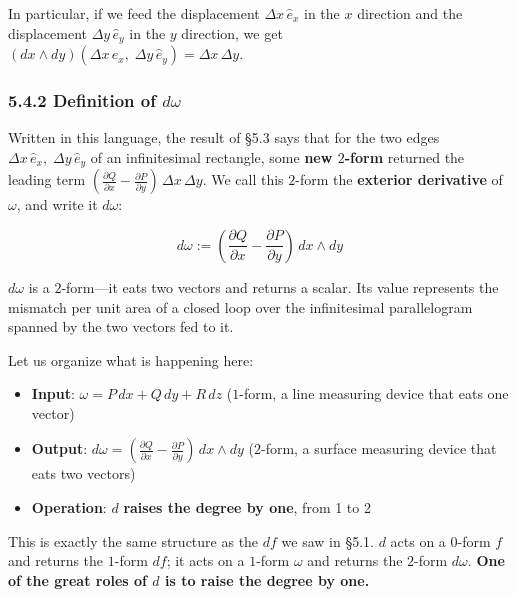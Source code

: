 \documentclass[a4paper,12pt,openany]{book}
\begin{document}
In particular, if we feed the displacement \(\Delta x\,\hat{e}_x\) in
the \(x\) direction and the displacement \(\Delta y\,\hat{e}_y\) in the
\(y\) direction, we get
\((dx \wedge dy)(\Delta x\,\hat{e}_x,\; \Delta y\,\hat{e}_y) = \Delta x\,\Delta y\).

\hypertarget{definition-of-domega}{%
\subsubsection{\texorpdfstring{5.4.2 Definition of
\(d\omega\)}{5.4.2 Definition of d\textbackslash omega}}\label{definition-of-domega}}

Written in this language, the result of §5.3 says that for the two edges
\(\Delta x\,\hat{e}_x,\; \Delta y\,\hat{e}_y\) of an infinitesimal
rectangle, some \textbf{new $2$-form} returned the leading term
\((\frac{\partial Q}{\partial x} - \frac{\partial P}{\partial y})\,\Delta x\,\Delta y\).
We call this \(2\)-form the \textbf{exterior derivative} of \(\omega\),
and write it \(d\omega\):

\[d\omega := (\frac{\partial Q}{\partial x} - \frac{\partial P}{\partial y})\,dx \wedge dy\]

\(d\omega\) is a \(2\)-form—it eats two vectors and returns a scalar.
Its value represents the mismatch per unit area of a closed loop over
the infinitesimal parallelogram spanned by the two vectors fed to it.

Let us organize what is happening here:

\begin{itemize}
\item
  \textbf{Input}: \(\omega = P\,dx + Q\,dy + R\,dz\) (\(1\)-form, a line
  measuring device that eats one vector)
\item
  \textbf{Output}:
  \(d\omega = (\frac{\partial Q}{\partial x} - \frac{\partial P}{\partial y})\,dx \wedge dy\)
  (\(2\)-form, a surface measuring device that eats two vectors)
\item
  \textbf{Operation}: \(d\) \textbf{raises the degree by one}, from 1 to
  2
\end{itemize}

This is exactly the same structure as the \(df\) we saw in §5.1. \(d\)
acts on a \(0\)-form \(f\) and returns the \(1\)-form \(df\); it acts on
a \(1\)-form \(\omega\) and returns the \(2\)-form \(d\omega\).
\textbf{One of the great roles of $d$ is to raise the degree by one.}
\end{document}
